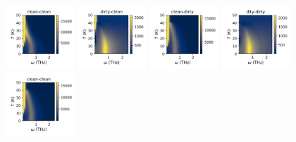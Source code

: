 \documentclass[a4paper]{article}
\begin{document}
\begin{figure}[H]
  \includegraphics[width=0.23\textwidth]{v2-g4_abs.png}
  \includegraphics[width=0.23\textwidth]{v3-g1_abs.png}
  \includegraphics[width=0.23\textwidth]{v3-g2_abs.png}
  \includegraphics[width=0.23\textwidth]{v3-g3_abs.png}
  \includegraphics[width=0.23\textwidth]{v3-g4_abs.png}
\end{figure}
\end{document}
